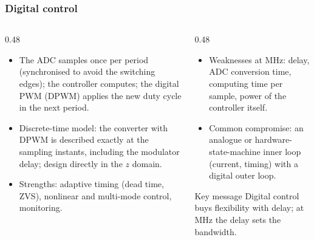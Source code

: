 \begin{frame}
	\frametitle{Digital control}
	\begin{columns}[T]
		\begin{column}{0.48\textwidth}
			\small
			\begin{itemize}
				\item The ADC samples once per period (synchronised to avoid the switching edges); the controller computes; the digital PWM (DPWM) applies the new duty cycle in the next period.
				\item Discrete-time model: the converter with DPWM is described exactly at the sampling instants, including the modulator delay; design directly in the $z$ domain.
				\item Strengths: adaptive timing (dead time, ZVS), nonlinear and multi-mode control, monitoring.
			\end{itemize}
		\end{column}
		\begin{column}{0.48\textwidth}
			\small
			\begin{itemize}
				\item Weaknesses at MHz: delay, ADC conversion time, computing time per sample, power of the controller itself.
				\item Common compromise: an analogue or hardware-state-machine inner loop (current, timing) with a digital outer loop.
			\end{itemize}
			\begin{block}{Key message}
				Digital control buys flexibility with delay; at MHz the delay sets the bandwidth.
			\end{block}
		\end{column}
	\end{columns}
\end{frame}


